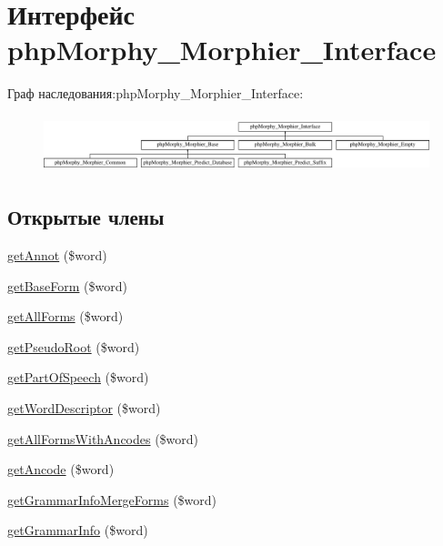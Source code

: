 \hypertarget{interfacephpMorphy__Morphier__Interface}{
\section{Интерфейс phpMorphy\_\-Morphier\_\-Interface}
\label{interfacephpMorphy__Morphier__Interface}
}
Граф наследования:phpMorphy\_\-Morphier\_\-Interface:\begin{figure}[H]
\begin{center}
\leavevmode
\includegraphics[height=1.673307cm]{interfacephpMorphy__Morphier__Interface}
\end{center}
\end{figure}
\subsection*{Открытые члены}
\begin{DoxyCompactItemize}
\item 
\hyperlink{interfacephpMorphy__Morphier__Interface_aa9e89aa99c0dc2a01ee06ce8fdd53944}{getAnnot} (\$word)
\item 
\hyperlink{interfacephpMorphy__Morphier__Interface_a52fe2c93386f96dace962450281c5cdd}{getBaseForm} (\$word)
\item 
\hyperlink{interfacephpMorphy__Morphier__Interface_a5b374aca3325f7f69ffc0ba0a8e965ef}{getAllForms} (\$word)
\item 
\hyperlink{interfacephpMorphy__Morphier__Interface_a4e3019058b52479c0cd4f29cce869975}{getPseudoRoot} (\$word)
\item 
\hyperlink{interfacephpMorphy__Morphier__Interface_a3992ac557345b07f453b2dba49d5d99d}{getPartOfSpeech} (\$word)
\item 
\hyperlink{interfacephpMorphy__Morphier__Interface_ae22b2f62f4cd5b9c5977ec82c7a25a71}{getWordDescriptor} (\$word)
\item 
\hyperlink{interfacephpMorphy__Morphier__Interface_aea03c4f8c13e5fab329de13c8b815e98}{getAllFormsWithAncodes} (\$word)
\item 
\hyperlink{interfacephpMorphy__Morphier__Interface_a5c52cb3bef45fcbf829437684aee0a44}{getAncode} (\$word)
\item 
\hyperlink{interfacephpMorphy__Morphier__Interface_a1b96eb25e006e9e8f37b9de5cd1b9a31}{getGrammarInfoMergeForms} (\$word)
\item 
\hyperlink{interfacephpMorphy__Morphier__Interface_ae93e63413a2e385c8d823e576fbfc8a6}{getGrammarInfo} (\$word)
\end{DoxyCompactItemize}


